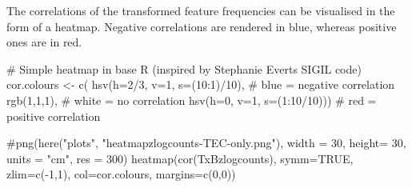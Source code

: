 \documentclass[
  letterpaper,
  DIV=11,
  numbers=noendperiod]{scrreprt}
\newenvironment{Shaded}{\begin{snugshade}}{\end{snugshade}}
\newcommand{\AttributeTok}[1]{\textcolor[rgb]{0.40,0.45,0.13}{#1}}
\newcommand{\CommentTok}[1]{\textcolor[rgb]{0.37,0.37,0.37}{#1}}
\newcommand{\ConstantTok}[1]{\textcolor[rgb]{0.56,0.35,0.01}{#1}}
\newcommand{\DecValTok}[1]{\textcolor[rgb]{0.68,0.00,0.00}{#1}}
\newcommand{\FunctionTok}[1]{\textcolor[rgb]{0.28,0.35,0.67}{#1}}
\newcommand{\NormalTok}[1]{\textcolor[rgb]{0.00,0.23,0.31}{#1}}
\newcommand{\OtherTok}[1]{\textcolor[rgb]{0.00,0.23,0.31}{#1}}
\newcommand{\SpecialCharTok}[1]{\textcolor[rgb]{0.37,0.37,0.37}{#1}}
\begin{document}
The correlations of the transformed feature frequencies can be
visualised in the form of a heatmap. Negative correlations are rendered
in blue, whereas positive ones are in red.

\begin{Shaded}
\begin{Highlighting}[]
\CommentTok{\# Simple heatmap in base R (inspired by Stephanie Evert\textquotesingle{}s SIGIL code)}
\NormalTok{cor.colours }\OtherTok{\textless{}{-}} \FunctionTok{c}\NormalTok{(}
  \FunctionTok{hsv}\NormalTok{(}\AttributeTok{h=}\DecValTok{2}\SpecialCharTok{/}\DecValTok{3}\NormalTok{, }\AttributeTok{v=}\DecValTok{1}\NormalTok{, }\AttributeTok{s=}\NormalTok{(}\DecValTok{10}\SpecialCharTok{:}\DecValTok{1}\NormalTok{)}\SpecialCharTok{/}\DecValTok{10}\NormalTok{), }\CommentTok{\# blue = negative correlation }
  \FunctionTok{rgb}\NormalTok{(}\DecValTok{1}\NormalTok{,}\DecValTok{1}\NormalTok{,}\DecValTok{1}\NormalTok{), }\CommentTok{\# white = no correlation }
  \FunctionTok{hsv}\NormalTok{(}\AttributeTok{h=}\DecValTok{0}\NormalTok{, }\AttributeTok{v=}\DecValTok{1}\NormalTok{, }\AttributeTok{s=}\NormalTok{(}\DecValTok{1}\SpecialCharTok{:}\DecValTok{10}\SpecialCharTok{/}\DecValTok{10}\NormalTok{))) }\CommentTok{\# red = positive correlation}

\CommentTok{\#png(here("plots", "heatmapzlogcounts{-}TEC{-}only.png"), width = 30, height= 30, units = "cm", res = 300)}
\FunctionTok{heatmap}\NormalTok{(}\FunctionTok{cor}\NormalTok{(TxBzlogcounts), }
        \AttributeTok{symm=}\ConstantTok{TRUE}\NormalTok{, }
        \AttributeTok{zlim=}\FunctionTok{c}\NormalTok{(}\SpecialCharTok{{-}}\DecValTok{1}\NormalTok{,}\DecValTok{1}\NormalTok{), }
        \AttributeTok{col=}\NormalTok{cor.colours, }
        \AttributeTok{margins=}\FunctionTok{c}\NormalTok{(}\DecValTok{0}\NormalTok{,}\DecValTok{0}\NormalTok{))}
\end{Highlighting}
\end{Shaded}
\end{document}
